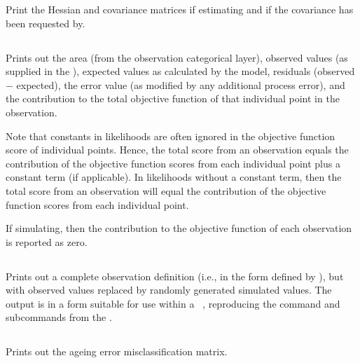 Print the Hessian and covariance matrices if estimating and if the covariance has been requested by.

\subsection{}

Prints out the area (from the observation categorical layer), observed values (as supplied in the \config), expected values as calculated by the model, residuals (observed $-$ expected), the error value (as modified by any additional process error), and the contribution to the total objective function of that individual point in the observation. 

Note that constants in likelihoods are often ignored in the objective function score of individual points. Hence, the total score from an observation equals the contribution of the objective function scores from each individual point plus a constant term (if applicable). In likelihoods without a constant term, then the total score from an observation will equal the contribution of the objective function scores from each individual point.

If simulating, then the contribution to the objective function of each observation is reported as zero. 

\subsection{}

Prints out a complete observation definition (i.e., in the form defined by ), but with observed values replaced by randomly generated simulated values. The output is in a form  suitable for use within a \SPM\ \config, reproducing the command and subcommands from the \config.

\subsection{}\label{sec:ageingerrorreport}

Prints out the ageing error misclassification matrix.

\subsection{}


